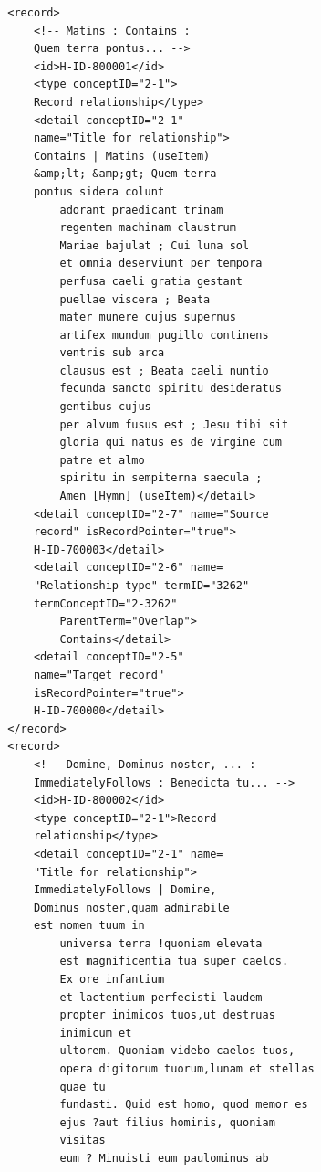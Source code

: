 \documentclass[a4paper,12pt,twoside]{book}
\begin{document}
\begin{verbatim}
        <record>
            <!-- Matins : Contains : 
            Quem terra pontus... -->
            <id>H-ID-800001</id>
            <type conceptID="2-1">
            Record relationship</type>
            <detail conceptID="2-1" 
            name="Title for relationship">
            Contains | Matins (useItem) 
            &amp;lt;-&amp;gt; Quem terra 
            pontus sidera colunt
                adorant praedicant trinam
                regentem machinam claustrum 
                Mariae bajulat ; Cui luna sol
                et omnia deserviunt per tempora 
                perfusa caeli gratia gestant 
                puellae viscera ; Beata
                mater munere cujus supernus 
                artifex mundum pugillo continens
                ventris sub arca
                clausus est ; Beata caeli nuntio
                fecunda sancto spiritu desideratus
                gentibus cujus
                per alvum fusus est ; Jesu tibi sit
                gloria qui natus es de virgine cum 
                patre et almo
                spiritu in sempiterna saecula ;
                Amen [Hymn] (useItem)</detail>
            <detail conceptID="2-7" name="Source
            record" isRecordPointer="true">
            H-ID-700003</detail>
            <detail conceptID="2-6" name=
            "Relationship type" termID="3262"
            termConceptID="2-3262"
                ParentTerm="Overlap">
                Contains</detail>
            <detail conceptID="2-5" 
            name="Target record"
            isRecordPointer="true">
            H-ID-700000</detail>
        </record>
        <record>
            <!-- Domine, Dominus noster, ... :
            ImmediatelyFollows : Benedicta tu... -->
            <id>H-ID-800002</id>
            <type conceptID="2-1">Record 
            relationship</type>
            <detail conceptID="2-1" name=
            "Title for relationship">
            ImmediatelyFollows | Domine, 
            Dominus noster,quam admirabile 
            est nomen tuum in
                universa terra !quoniam elevata
                est magnificentia tua super caelos. 
                Ex ore infantium
                et lactentium perfecisti laudem 
                propter inimicos tuos,ut destruas 
                inimicum et
                ultorem. Quoniam videbo caelos tuos, 
                opera digitorum tuorum,lunam et stellas 
                quae tu
                fundasti. Quid est homo, quod memor es 
                ejus ?aut filius hominis, quoniam 
                visitas
                eum ? Minuisti eum paulominus ab 

\end{verbatim}
\end{document}
